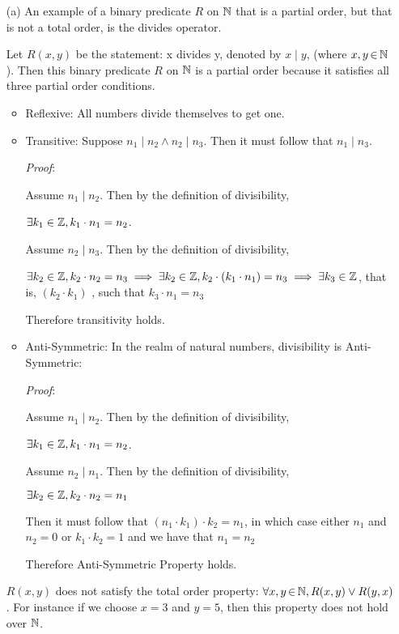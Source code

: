 \documentclass[12pt]{article}
\begin{document}
\begin{enumerate}
\item[(a)] An example of a binary predicate $R$ on $\mathbb N$ that is a partial order, but that is not a total order, is the divides operator.

Let $R(x, y)$ be the statement: x divides y, denoted by $x \mid y$, (where $x, y \,{\in}\, \mathbb N$). Then this binary predicate $R$ on $\mathbb N$ is a partial order because it satisfies all three partial order conditions.

\begin{itemize}
    \item Reflexive: All numbers divide themselves to get one.
    \item Transitive: Suppose $n_1 \mid n_2 \land n_2 \mid n_3$. Then it must follow that $n_1 \mid n_3$.

    \emph{Proof}:

    Assume $n_1 \mid n_2$. Then by the definition of divisibility,

    $\exists k_1 \in \mathbb Z, k_1 \cdot n_1 = n_2$.

    Assume $n_2 \mid n_3$. Then by the definition of divisibility,

    $\exists k_2 \in \mathbb Z, k_2 \cdot n_2 = n_3 \implies \exists k_2 \in \mathbb Z, k_2 \cdot (k_1 \cdot n_1) = n_3 \implies  \exists k_3 \in \mathbb Z$, that is, $( k_2 \cdot k_1)$ , such that $k_3 \cdot n_1 = n_3$

    Therefore transitivity holds.

    \item Anti-Symmetric: In the realm of natural numbers, divisibility is Anti-Symmetric:


    \emph{Proof}:

    Assume $n_1 \mid n_2$. Then by the definition of divisibility,

     $\exists k_1 \in \mathbb Z, k_1 \cdot n_1 = n_2$.

     Assume $n_2 \mid n_1$. Then by the definition of divisibility,

    $\exists k_2 \in \mathbb Z, k_2 \cdot n_2 = n_1$

    Then it must follow that $(n_1 \cdot k_1) \cdot k_2 = n_1$, in which case either $n_1$ and $n_2 = 0$ or $k_1 \cdot k_2 = 1$ and we have that $n_1 = n_2$

    Therefore Anti-Symmetric Property holds.



\end{itemize}


$R(x, y)$ does not satisfy the total order property:
$\forall x, y \,{\in}\, \mathbb N, R(x, y) \vee R(y, x)$. For instance if we choose $x = 3$ and $y = 5$, then this property does not hold over $\mathbb N$.


\end{enumerate}
\end{document}
